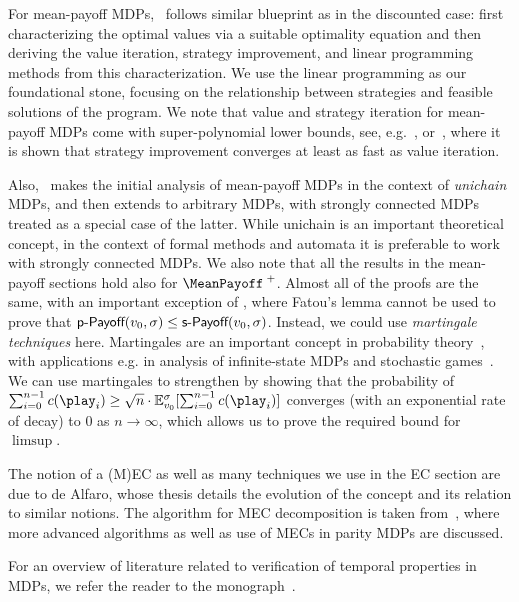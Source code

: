 For mean-payoff MDPs,~\cite{Puterman:2005} follows similar blueprint as in the discounted case: first characterizing the optimal values via a suitable optimality equation and then deriving the value iteration, strategy improvement, and linear programming methods from this characterization. We use the linear programming as our foundational stone, focusing on the relationship between strategies and feasible solutions of the program. We note that value and strategy iteration for mean-payoff MDPs come with super-polynomial lower bounds, see, e.g.~\cite{Fearnley:2010,Fearnley:2010b}, or~\cite{Puterman:2005}, where it is shown that strategy improvement converges at least as fast as value iteration.

Also,~\cite{Puterman:2005} makes the initial analysis of mean-payoff MDPs in the context of \emph{unichain} MDPs, and then extends to arbitrary MDPs, with strongly connected MDPs treated as a special case of the latter. While unichain is an important theoretical concept, in the context of formal methods and automata it is preferable to work with strongly connected MDPs. We also note that all the results in the mean-payoff sections hold also for $\MeanPayoffSup$. Almost all of the proofs are the same, with an important exception of , where Fatou's lemma cannot be used to prove that $\textsf{p-Payoff}(v_0,\sigma) \leq \textsf{s-Payoff}(v_0,\sigma)$. Instead, we could use \emph{martingale techniques} here. Martingales are an important concept in probability theory~\cite{Wil:1991}, with applications e.g. in analysis of infinite-state MDPs and stochastic games~\cite{Brazdil&Brozek&Etessami&Kucera:2011}. We can use martingales to strengthen  by showing that the probability  of $\sum_{i=0}^{n-1}\colouring(\play_i) \geq \sqrt{n}\cdot \expv^\sigma_{\vinit}[\sum_{i=0}^{n-1}\colouring(\play_i)]$ converges (with an exponential rate of decay) to $0$ as $n\rightarrow \infty$, which allows us to prove the required bound for $\limsup$.

 The notion of a (M)EC as well as many techniques we use in the EC section are due to de Alfaro, whose thesis \cite{dA:1997} details the evolution of the concept and its relation to similar notions. The algorithm for MEC decomposition is taken from~\cite{Chatterjee&Henzinger:2011}, where more advanced algorithms as well as use of MECs in parity MDPs are discussed.

For an overview of literature related to verification of temporal properties in MDPs, we refer the reader to the monograph~\cite{Baier&Katoen:2008}.

